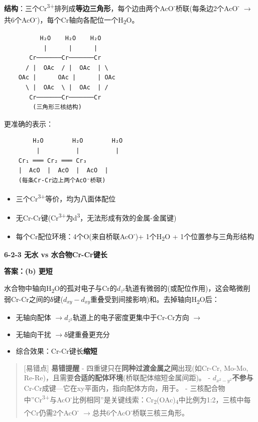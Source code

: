 \documentclass[a4paper,11pt]{ctexart}
\providecommand{\tightlist}{\setlength{\itemsep}{0pt}\setlength{\parskip}{0pt}}
\newcommand{\箭}{\ensuremath{\rightarrow}}
\newcommand{\左箭}{\ensuremath{\leftarrow}}
\newcommand{\上箭}{\ensuremath{\uparrow}}
\newcommand{\下箭}{\ensuremath{\downarrow}}
\newcommand{\衡}{\ensuremath{\rightleftharpoons}}
\newcommand{\双箭}{\ensuremath{\leftrightarrow}}
\newcommand{\约等于}{\ensuremath{\approx}}
\newcommand{\小于等于}{\ensuremath{\leq}}
\newcommand{\大于等于}{\ensuremath{\geq}}
\newcommand{\不等于}{\ensuremath{\neq}}
\newcommand{\西格马}{\ensuremath{\sigma}}
\newcommand{\派}{\ensuremath{\pi}}
\begin{document}
\textbf{结构}：三个Cr\textsuperscript{3+}排列成\textbf{等边三角形}，每个边由两个AcO\textsuperscript{-}桥联(每条边2个AcO\textsuperscript{-} \箭 共6个AcO\textsuperscript{-})，每个Cr轴向各配位一个H\textsubscript{2}O。

\begin{verbatim}
          H₂O    H₂O    H₂O
           |      |      |
       Cr───────Cr───────Cr
      / |  OAc  / |  OAc  | \
    OAc |      OAc |      | OAc
      \ |  OAc  \ |  OAc  | /
       Cr───────Cr───────Cr
        (三角形三核结构)
\end{verbatim}

更准确的表示：

\begin{verbatim}
        H₂O        H₂O        H₂O
         |          |          |
    Cr₁ ═══ Cr₂ ═══ Cr₃
    |  AcO  |  AcO  |  AcO  |
    (每条Cr-Cr边上两个AcO⁻桥联)
\end{verbatim}

\begin{itemize}
\tightlist
\item
  三个Cr\textsuperscript{3+}等价，均为八面体配位
\item
  无Cr-Cr键(Cr\textsuperscript{3+}为d\textsuperscript{3}，无法形成有效的金属-金属键)
\item
  每个Cr配位环境：4个O(来自桥联AcO\textsuperscript{-})+ 1个H\textsubscript{2}O + 1个位置参与三角形结构
\end{itemize}

\textbf{6-2-3 无水 vs 水合物Cr-Cr键长}

\textbf{答案：(b) 更短}

水合物中轴向H\textsubscript{2}O的孤对电子与Cr的\(d_{z^2}\)轨道有微弱的(或配位作用)，这会略微削弱Cr-Cr之间的δ键(\(d_{xy}-d_{xy}\)重叠受到间接影响)和。去掉轴向H\textsubscript{2}O后：

\begin{itemize}
\tightlist
\item
  无轴向配体 \箭 \(d_{z^2}\)轨道上的电子密度更集中于Cr-Cr方向 \箭 
\item
  无轴向干扰 \箭 δ键重叠更充分
\item
  综合效果：Cr-Cr键长\textbf{缩短}
\end{itemize}

\begin{quote}
{[}易错点{]} \textbf{易错提醒}
- 四重键只在\textbf{同种过渡金属之间}出现(如Cr-Cr, Mo-Mo, Re-Re)，且需要\textbf{合适的配体环境}(桥联配体缩短金属间距)。
- \(d_{x^2-y^2}\)\textbf{不参与}Cr-Cr成键---它在xy平面内，指向配体方向，用于\西格马配位。
- 三核配合物中''Cr\textsuperscript{3+}与AcO\textsuperscript{-}比例相同''是关键线索：Cr\textsubscript{2}(OAc)\textsubscript{4}中比例为1:2，三核中每个Cr仍需2个AcO\textsuperscript{-} \箭 总共6个AcO\textsuperscript{-}桥联三核三角形。
\end{quote}
\end{document}

